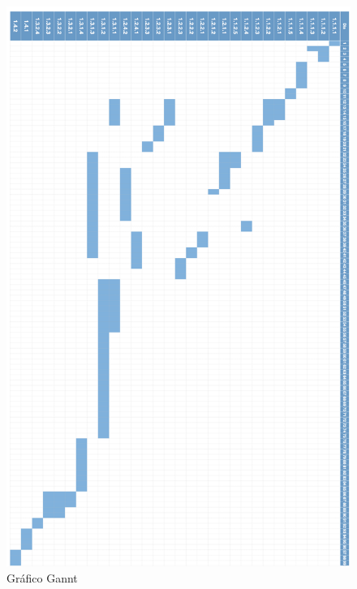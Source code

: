 \documentclass[a4paper,11pt]{article}
\begin{document}
    	\begin{figure}[!H]
    		\centering
        	\includegraphics[width=\textwidth,height=\dimexpr\textheight-3\baselineskip\relax,keepaspectratio]{gannt.png}
        	\caption{Gráfico Gannt}
        	
     		\label{gannt}
    	\end{figure}
\end{document}
